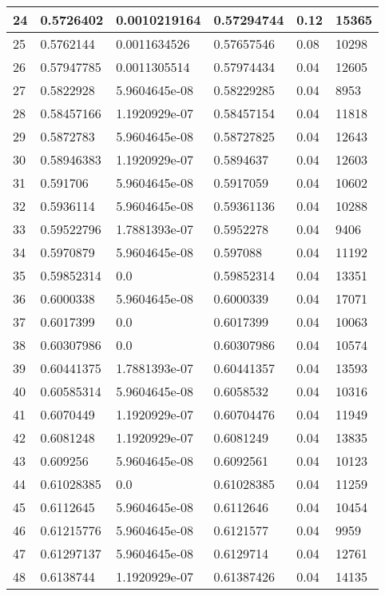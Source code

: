 \begin{longtable}{|l|l|l|l|l|l|}
24 & 0.5726402 & 0.0010219164 & 0.57294744 & 0.12 & 15365 \\ \hline 
25 & 0.5762144 & 0.0011634526 & 0.57657546 & 0.08 & 10298 \\ \hline 
26 & 0.57947785 & 0.0011305514 & 0.57974434 & 0.04 & 12605 \\ \hline 
27 & 0.5822928 & 5.9604645e-08 & 0.58229285 & 0.04 & 8953 \\ \hline 
28 & 0.58457166 & 1.1920929e-07 & 0.58457154 & 0.04 & 11818 \\ \hline 
29 & 0.5872783 & 5.9604645e-08 & 0.58727825 & 0.04 & 12643 \\ \hline 
30 & 0.58946383 & 1.1920929e-07 & 0.5894637 & 0.04 & 12603 \\ \hline 
31 & 0.591706 & 5.9604645e-08 & 0.5917059 & 0.04 & 10602 \\ \hline 
32 & 0.5936114 & 5.9604645e-08 & 0.59361136 & 0.04 & 10288 \\ \hline 
33 & 0.59522796 & 1.7881393e-07 & 0.5952278 & 0.04 & 9406 \\ \hline 
34 & 0.5970879 & 5.9604645e-08 & 0.597088 & 0.04 & 11192 \\ \hline 
35 & 0.59852314 & 0.0 & 0.59852314 & 0.04 & 13351 \\ \hline 
36 & 0.6000338 & 5.9604645e-08 & 0.6000339 & 0.04 & 17071 \\ \hline 
37 & 0.6017399 & 0.0 & 0.6017399 & 0.04 & 10063 \\ \hline 
38 & 0.60307986 & 0.0 & 0.60307986 & 0.04 & 10574 \\ \hline 
39 & 0.60441375 & 1.7881393e-07 & 0.60441357 & 0.04 & 13593 \\ \hline 
40 & 0.60585314 & 5.9604645e-08 & 0.6058532 & 0.04 & 10316 \\ \hline 
41 & 0.6070449 & 1.1920929e-07 & 0.60704476 & 0.04 & 11949 \\ \hline 
42 & 0.6081248 & 1.1920929e-07 & 0.6081249 & 0.04 & 13835 \\ \hline 
43 & 0.609256 & 5.9604645e-08 & 0.6092561 & 0.04 & 10123 \\ \hline 
44 & 0.61028385 & 0.0 & 0.61028385 & 0.04 & 11259 \\ \hline 
45 & 0.6112645 & 5.9604645e-08 & 0.6112646 & 0.04 & 10454 \\ \hline 
46 & 0.61215776 & 5.9604645e-08 & 0.6121577 & 0.04 & 9959 \\ \hline 
47 & 0.61297137 & 5.9604645e-08 & 0.6129714 & 0.04 & 12761 \\ \hline 
48 & 0.6138744 & 1.1920929e-07 & 0.61387426 & 0.04 & 14135 \\ \hline 

\end{longtable}
